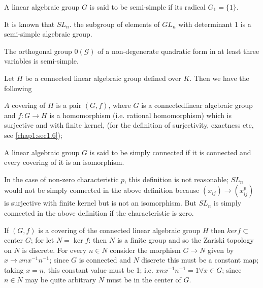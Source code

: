 \begin{defn}\label{chap1:def1}%
A linear algebraic group $G$ is said to be semi-simple if its radical
$G_1 = \{1\}$. 
\end{defn}

\setcounter{exam}{1}
\begin{exam}%
  It is known that $SL_n$. the subgroup of elements of $GL_n$ with
  determinant 1 is a semi-simple algebraic group. 
\end{exam}

\begin{exam}%
The orthogonal group $0 (\mathscr{G})$ of a non-degenerate quadratic
form in at least three variables is semi-simple. 
\end{exam}

Let $H$ be a connected linear algebraic group defined over $K$. Then
we have the following  

\begin{defn}%
$A$ covering of $H$ is a pair $(G,f)$, where $G$ is a
  connected\pageoriginale linear algebraic group and  $f:G
  \rightarrow H$ is a homomorphism (i.e. rational homomorphism)
  which is surjective and with finite kernel, (for the definition of
  surjectivity, exactness etc, see \ref{chap1:sec1.6}); 
\end{defn}

\begin{defi*}%
A linear algebraic group $G$ is said to be simply connected if it is
connected and every covering of it is an isomorphism. 
\end{defi*}

\begin{rem}\label{chap2:rem1}
In the case of  non-zero characteristic $p$, this definition is not
reasonable; $SL_n$ would not be simply connected in the above
definition because $(x_{ij}) \rightarrow (x^{p}_{ij})$ is surjective
with finite kernel but is not  an isomorphism. But $SL_n$ is simply
connected in the above definition if the characteristic is zero. 
\end{rem}

\begin{rem}\label{chap2:rem2}
If $(G,f)$ is a covering of the connected  linear algebraic group $H$
then $ker f \subset $ center $G$; for let $N = \ker f$: then $N$ is a
finite group and so the Zariski topology on $N$ is discrete. For every
$n \in N$ consider the morphism  $G \rightarrow N$ given by $x
\rightarrow x n x^{-1}n^{-1}$; since $G$ is connected and $N$ discrete
this must be a constant map; taking $x = n$, this constant value must
be 1; i.e. $xnx^{-1} n^{-1} = 1 \forall x \in G$; since $n \in N$ 
 may be quite arbitrary $N$ must be in the center of $G$.  
\end{rem}

